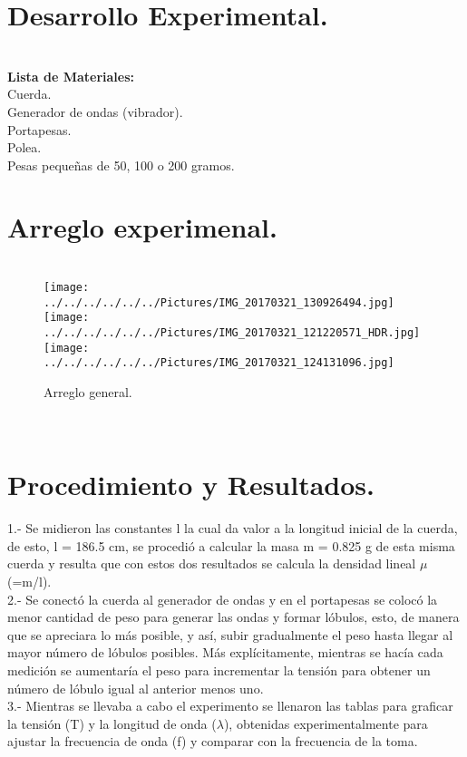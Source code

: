 \documentclass[10pt,a4paper]{article}
\begin{document}
\section*{Desarrollo Experimental.}\\
\textbf{Lista de Materiales:} \\
Cuerda.\\
Generador de ondas (vibrador).\\
Portapesas.\\
Polea.\\
Pesas peque\~{n}as de 50, 100 o 200 gramos.\\

\section*{Arreglo experimenal.}
\begin{figure}[hbtp]
\centering
\\
\texttt{[image: ../../../../../../Pictures/IMG\_20170321\_130926494.jpg]} \\

\texttt{[image: ../../../../../../Pictures/IMG\_20170321\_121220571\_HDR.jpg]} 
\texttt{[image: ../../../../../../Pictures/IMG\_20170321\_124131096.jpg]} 
\caption{Arreglo general. }
\end{figure} 
\\

\section*{Procedimiento y Resultados.}
1.- Se midieron las constantes l la cual da valor a la longitud inicial de la cuerda, de esto, l = 186.5 cm, se procedi\'{o} a calcular la masa m = 0.825 g de esta misma cuerda y resulta que con estos dos resultados se calcula la densidad lineal $\mu$ (=m/l).\\
2.-	Se conect\'{o} la cuerda al generador de ondas y en el portapesas se coloc\'{o} la menor cantidad de peso para generar las ondas y formar l\'{o}bulos, esto, de manera que se apreciara lo m\'{a}s posible, y as\'{i}, subir gradualmente el peso hasta llegar al mayor n\'{u}mero de l\'{o}bulos posibles. M\'{a}s expl\'{i}citamente, mientras se hac\'{i}a cada medici\'{o}n se aumentar\'{i}a el peso para incrementar la tensi\'{o}n para obtener un n\'{u}mero de l\'{o}bulo igual al anterior menos uno.\\
3.- Mientras se llevaba a cabo el experimento se llenaron las tablas para graficar la tensi\'{o}n (T) y la longitud de onda ($ \lambda$), obtenidas experimentalmente para ajustar la frecuencia de onda (f) y comparar con la frecuencia de la toma.\\
\medskip
\end{document}
